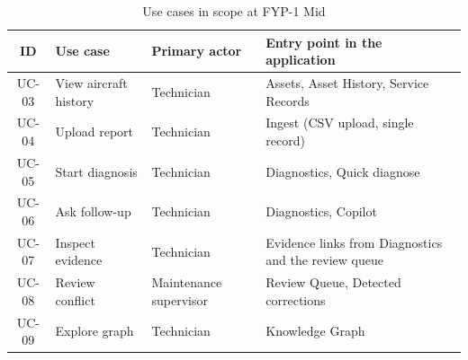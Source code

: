 \begin{table}[H]
\centering
\caption{Use cases in scope at FYP-1 Mid}
\label{tab:usecases}
\small
\begin{tabularx}{\textwidth}{@{}c >{\raggedright\arraybackslash}p{} >{\raggedright\arraybackslash}p{} L@{}}
\toprule
ID & Use case & Primary actor & Entry point in the application \\
\midrule
UC-03 & View aircraft history & Technician & Assets, Asset History, Service Records \\
UC-04 & Upload report & Technician & Ingest (CSV upload, single record) \\
UC-05 & Start diagnosis & Technician & Diagnostics, Quick diagnose \\
UC-06 & Ask follow-up & Technician & Diagnostics, Copilot \\
UC-07 & Inspect evidence & Technician & Evidence links from Diagnostics and the review queue \\
UC-08 & Review conflict & Maintenance supervisor & Review Queue, Detected corrections \\
UC-09 & Explore graph & Technician & Knowledge Graph \\
\bottomrule
\end{tabularx}
\end{table}
